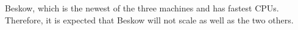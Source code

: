 \documentclass{sig-alternate}
\begin{document}
Beskow, which is the newest of the three machines and has fastest CPUs. Therefore,
it is expected that Beskow will not scale as well as the two others.

\begin{figure}
  \centering
\end{figure}
\end{document}
